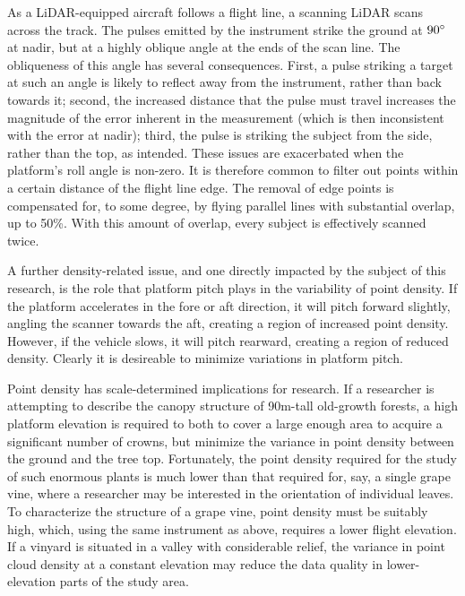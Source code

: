 \documentclass[10pt,a4paper]{report}
\begin{document}
As a LiDAR-equipped aircraft follows a flight line, a scanning LiDAR scans across the track. The pulses emitted by the instrument strike the ground at $90\degree$ at nadir, but at a highly oblique angle at the ends of the scan line. The obliqueness of this angle has several consequences. First, a pulse striking a target at such an angle is likely to reflect away from the instrument, rather than back towards it; second, the increased distance that the pulse must travel increases the magnitude of the error inherent in the measurement (which is then inconsistent with the error at nadir); third, the pulse is striking the subject from the side, rather than the top, as intended. These issues are exacerbated when the platform's roll angle is non-zero. It is therefore common to filter out points within a certain distance of the flight line edge. The removal of edge points is compensated for, to some degree, by flying parallel lines with substantial overlap, up to 50\%. With this amount of overlap, every subject is effectively scanned twice.

A further density-related issue, and one directly impacted by the subject of this research, is the role that platform pitch plays in the variability of point density. If the platform accelerates in the fore or aft direction, it will pitch forward slightly, angling the scanner towards the aft, creating a region of increased point density. However, if the vehicle slows, it will pitch rearward, creating a region of reduced density. Clearly it is desireable to minimize variations in platform pitch.

Point density has scale-determined implications for research. If a researcher is attempting to describe the canopy structure of 90m-tall old-growth forests, a high platform elevation is required to both to cover a large enough area to acquire a significant number of crowns, but minimize the variance in point density between the ground and the tree top. Fortunately, the point density required for the study of such enormous plants is much lower than that required for, say, a single grape vine, where a researcher may be interested in the orientation of individual leaves. To characterize the structure of a grape vine, point density must be suitably high, which, using the same instrument as above, requires a lower flight elevation. If a vinyard is situated in a valley with considerable relief, the variance in point cloud density at a constant elevation may reduce the data quality in lower-elevation  parts of the study area.
\end{document}

